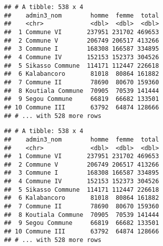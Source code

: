 \documentclass[]{book}
\newenvironment{Shaded}{\begin{snugshade}}{\end{snugshade}}
\newcommand{\KeywordTok}[1]{\textcolor[rgb]{0.13,0.29,0.53}{\textbf{#1}}}
\newcommand{\DataTypeTok}[1]{\textcolor[rgb]{0.13,0.29,0.53}{#1}}
\newcommand{\DecValTok}[1]{\textcolor[rgb]{0.00,0.00,0.81}{#1}}
\newcommand{\StringTok}[1]{\textcolor[rgb]{0.31,0.60,0.02}{#1}}
\newcommand{\CommentTok}[1]{\textcolor[rgb]{0.56,0.35,0.01}{\textit{#1}}}
\newcommand{\OperatorTok}[1]{\textcolor[rgb]{0.81,0.36,0.00}{\textbf{#1}}}
\newcommand{\NormalTok}[1]{#1}
\begin{document}
\begin{verbatim}
## # A tibble: 538 x 4
##    admin3_nom        homme  femme  total
##    <chr>             <dbl>  <dbl>  <dbl>
##  1 Commune VI       237951 231702 469653
##  2 Commune V        206749 206517 413266
##  3 Commune I        168308 166587 334895
##  4 Commune IV       152153 152373 304526
##  5 Sikasso Commune  114171 112447 226618
##  6 Kalabancoro       81018  80864 161882
##  7 Commune II        78690  80670 159360
##  8 Koutiala Commune  70905  70539 141444
##  9 Segou Commune     66819  66682 133501
## 10 Commune III       63792  64874 128666
## # ... with 528 more rows
\end{verbatim}

\begin{Shaded}
\end{Shaded}

\begin{verbatim}
## # A tibble: 538 x 4
##    admin3_nom        homme  femme  total
##    <chr>             <dbl>  <dbl>  <dbl>
##  1 Commune VI       237951 231702 469653
##  2 Commune V        206749 206517 413266
##  3 Commune I        168308 166587 334895
##  4 Commune IV       152153 152373 304526
##  5 Sikasso Commune  114171 112447 226618
##  6 Kalabancoro       81018  80864 161882
##  7 Commune II        78690  80670 159360
##  8 Koutiala Commune  70905  70539 141444
##  9 Segou Commune     66819  66682 133501
## 10 Commune III       63792  64874 128666
## # ... with 528 more rows
\end{verbatim}
\end{document}
